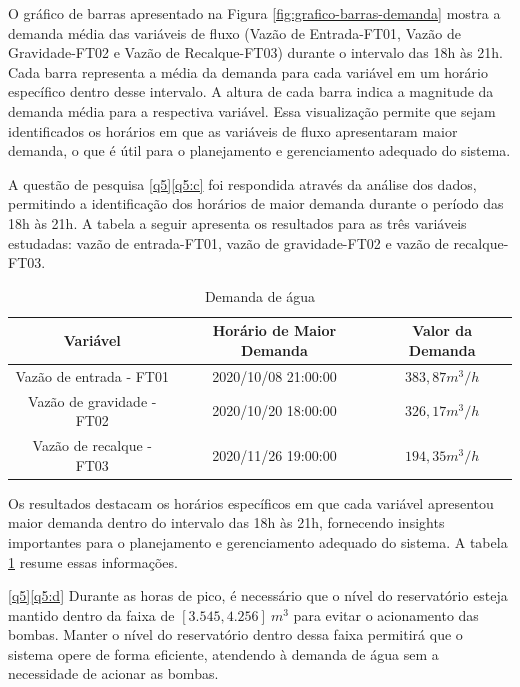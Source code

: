 O gráfico de barras apresentado na Figura \ref{fig:grafico-barras-demanda} mostra a demanda média das variáveis de fluxo (Vazão de Entrada-FT01, Vazão de Gravidade-FT02 e Vazão de Recalque-FT03) durante o intervalo das 18h às 21h. Cada barra representa a média da demanda para cada variável em um horário específico dentro desse intervalo. A altura de cada barra indica a magnitude da demanda média para a respectiva variável. Essa visualização permite que sejam identificados os horários em que as variáveis de fluxo apresentaram maior demanda, o que é útil para o planejamento e gerenciamento adequado do sistema.

A questão de pesquisa \ref{q5}\ref{q5:c} foi respondida através da análise dos dados, permitindo a identificação dos horários de maior demanda durante o período das 18h às 21h. A tabela a seguir apresenta os resultados para as três variáveis estudadas: vazão de entrada-FT01, vazão de gravidade-FT02 e vazão de recalque-FT03.




\begin{table}[!htb]
	\centering
	\caption{Demanda de água}\label{tb:dem}
	\begin{tabular}{@{}ccc@{}}
		\toprule
		\textbf{Variável}         & \textbf{Horário de Maior Demanda} & \textbf{Valor da Demanda} \\ \midrule
		Vazão de entrada - FT01   & 2020/10/08 21:00:00               & $383,87 m^3/h$                   \\
		Vazão de gravidade - FT02 & 2020/10/20 18:00:00               & $326,17 m^3/h$                    \\
		Vazão de recalque - FT03  & 2020/11/26 19:00:00               & $194,35 m^3/h$                    \\ \bottomrule
	\end{tabular}
	
	
\end{table}

Os resultados destacam os horários específicos em que cada variável apresentou maior demanda dentro do intervalo das 18h às 21h, fornecendo insights importantes para o planejamento e gerenciamento adequado do sistema. A tabela \ref{tb:dem} resume essas informações.


\ref{q5}\ref{q5:d} Durante as horas de pico, é necessário que o nível do reservatório esteja mantido dentro da faixa de $[3.545, 4.256] \ m^3$ para evitar o acionamento das bombas. Manter o nível do reservatório dentro dessa faixa permitirá que o sistema opere de forma eficiente, atendendo à demanda de água sem a necessidade de acionar as bombas.

